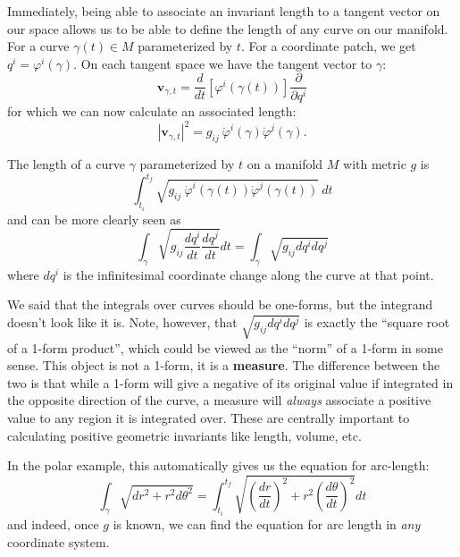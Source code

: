 \documentclass[../master.tex]{subfiles}
\begin{document}
	Immediately, being able to associate an invariant length to a tangent vector on our space allows us to be able to define the length of any curve on our manifold. For a curve $\gamma(t) \in M$ parameterized by $t$. For a coordinate patch, we get $q^i = \varphi^i(\gamma)$. On each tangent space we have the tangent vector to $\gamma$:
	\begin{equation}
		\mathbf v_{\gamma,t} = \frac{d}{dt} \left[ \varphi^i(\gamma(t)) \right] \frac{\partial}{\partial q^i}
	\end{equation}
	for which we can now calculate an associated length: 
	\begin{equation}
		|\mathbf v_{\gamma,t}|^2 = g_{ij} ~ \dot \varphi^i(\gamma) \dot \varphi^j(\gamma).
	\end{equation}
	\begin{prop}
		The length of a curve $\gamma$ parameterized by $t$ on a manifold $M$ with metric $g$ is
		\begin{equation}
			\int_{t_i}^{t_f} \sqrt{g_{ij} ~ \dot \varphi^i(\gamma(t)) \dot \varphi^j(\gamma(t))} ~ dt
		\end{equation}
		and can be more clearly seen as
		\begin{equation}
			\int_{\gamma} \sqrt{g_{ij} \frac{dq^i}{dt} \frac{dq^j}{dt}} dt = \int_{\gamma} \sqrt{g_{ij} dq^i dq^j}
		\end{equation}
		where $dq^i$ is the infinitesimal coordinate change along the curve at that point.
	\end{prop}
	We said that the integrals over curves should be one-forms, but the integrand doesn't look like it is. Note, however, that $\sqrt{g_{ij} dq^i dq^j}$ is exactly the ``square root of a 1-form product'', which could be viewed as the ``norm'' of a 1-form in some sense. This object is not a 1-form, it is a \textbf{measure}. The difference between the two is that while a 1-form will give a negative of its original value if integrated in the opposite direction of the curve, a measure will \emph{always} associate a positive value to any region it is integrated over. These are centrally important to calculating positive geometric invariants like length, volume, etc. 
	
	In the polar example, this automatically gives us the equation for arc-length:
	\begin{equation}
		\int_{\gamma} \sqrt{dr^2 + r^2 d\theta^2} 
		= \int_{t_i}^{t_f} \sqrt{\left( \frac{dr}{dt}\right)^2+ r^2 \left( \frac{d\theta}{dt} \right)^2 } dt
	\end{equation}
	and indeed, once $g$ is known, we can find the equation for arc length in \emph{any} coordinate system. 
	
\end{document}
